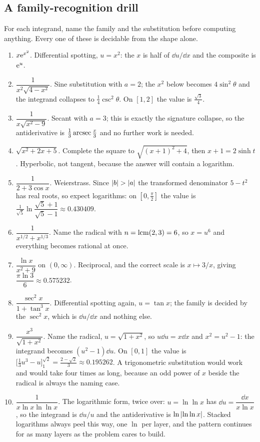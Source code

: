 \subsection{A family-recognition drill}

For each integrand, name the family and the substitution before computing anything. Every one of these is decidable from the shape alone.

\begin{enumerate}[label=(\roman*)]
\item $x\mathrm{e}^{x^2}$. Differential spotting, $u=x^2$: the $x$ is half of $\dd u/\dd x$ and the composite is $\mathrm{e}^{u}$.
\item $\dfrac{1}{x^2\sqrt{4-x^2}}$. Sine substitution with $a=2$; the $x^2$ below becomes $4\sin^2\theta$ and the integrand collapses to $\tfrac14\csc^2\theta$. On $[1,2]$ the value is $\tfrac{\sqrt3}{4}$.
\item $\dfrac{1}{x\sqrt{x^2-9}}$. Secant with $a=3$; this is exactly the signature collapse, so the antiderivative is $\tfrac13\operatorname{arcsec}\tfrac x3$ and no further work is needed.
\item $\sqrt{x^2+2x+5}$. Complete the square to $\sqrt{(x+1)^2+4}$, then $x+1=2\sinh t$. Hyperbolic, not tangent, because the answer will contain a logarithm.
\item $\dfrac{1}{2+3\cos x}$. Weierstrass. Since $\left\lvert b\right\rvert>\left\lvert a\right\rvert$ the transformed denominator $5-t^2$ has real roots, so expect logarithms: on $[0,\tfrac\pi2]$ the value is $\tfrac{1}{\sqrt5}\ln\dfrac{\sqrt5+1}{\sqrt5-1}\approx0.430409$.
\item $\dfrac{1}{x^{1/2}+x^{1/3}}$. Name the radical with $n=\operatorname{lcm}(2,3)=6$, so $x=u^6$ and everything becomes rational at once.
\item $\dfrac{\ln x}{x^2+9}$ on $(0,\infty)$. Reciprocal, and the correct scale is $x\mapsto3/x$, giving $\dfrac{\pi\ln3}{6}\approx0.575232$.
\item $\dfrac{\sec^2x}{1+\tan^3x}$. Differential spotting again, $u=\tan x$; the family is decided by the $\sec^2x$, which is $\dd u/\dd x$ and nothing else.
\item $\dfrac{x^3}{\sqrt{1+x^2}}$. Name the radical, $u=\sqrt{1+x^2}$, so $u\dd u=x\dd x$ and $x^2=u^2-1$: the integrand becomes $(u^2-1)\dd u$. On $[0,1]$ the value is $\bigl[\tfrac13u^3-u\bigr]_1^{\sqrt2}=\tfrac{2-\sqrt2}{3}\approx0.195262$. A trigonometric substitution would work and would take four times as long, because an odd power of $x$ beside the radical is always the naming case.
\item $\dfrac{1}{x\ln x\ln\ln x}$. The logarithmic form, twice over: $u=\ln\ln x$ has $\dd u=\dfrac{\dd x}{x\ln x}$, so the integrand is $\dd u/u$ and the antiderivative is $\ln\left\lvert \ln\ln x\right\rvert$. Stacked logarithms always peel this way, one $\ln$ per layer, and the pattern continues for as many layers as the problem cares to build.
\end{enumerate}

